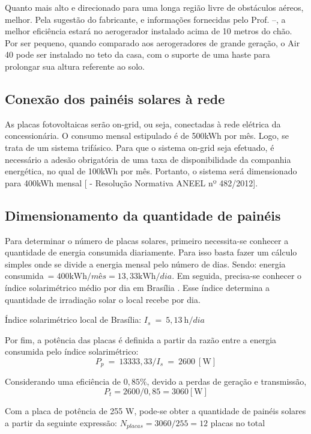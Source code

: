 	Quanto mais alto e direcionado para uma longa região livre de obstáculos aéreos, melhor. Pela sugestão do fabricante, e informações fornecidas pelo Prof. \cite{CORMANE} --, a melhor eficiência estará no aerogerador instalado acima de 10 metros do chão. Por ser pequeno, quando comparado aos aerogeradores de grande geração, o Air 40 pode ser instalado no teto da casa, com o suporte de uma haste para prolongar sua altura referente ao solo.

\subsection{Conexão dos painéis solares à rede}

	As placas fotovoltaicas serão on-grid, ou seja, conectadas à rede elétrica da concessionária. O consumo mensal estipulado é de 500kWh por mês. Logo, se trata de um sistema trifásico. Para que o sistema on-grid seja efetuado, é necessário a adesão obrigatória de uma taxa de disponibilidade da companhia energética, no qual de 100kWh por mês. Portanto, o sistema será dimensionado para 400kWh mensal [\cite{2013Aneel} -  Resolução Normativa ANEEL nº 482/2012].

\subsection{Dimensionamento da quantidade de painéis}

	Para determinar o número de placas solares, primeiro necessita-se conhecer a quantidade de energia consumida diariamente. Para isso basta fazer um cálculo simples onde se divide a energia mensal pelo número de dias. Sendo: energia consumida$\ = 400 \si{\kilo\watt\hour}/mês = 13,33 \si{\kilo\watt\hour}/dia$. Em seguida, precisa-se conhecer o índice solarimétrico médio por dia em Brasília \cite{2000UFPE}. Esse índice determina a quantidade de irradiação solar o local recebe por dia.

	Índice solarimétrico local de Brasília: $I_s\ =\ 5,13\ \si{\hour}/dia$

	Por fim, a potência das placas é definida a partir da razão entre a energia consumida pelo índice solarimétrico:$$P_p\ =\ 13333,33/I_s\ =\ 2600\ [\si{\watt}]$$

	Considerando uma eficiência de $0,85\%$, devido a perdas de geração e transmissão, $$P_t = 2600/0,85 = 3060 [\si{\watt}]$$

	Com a placa de potência de 255 W, pode-se obter a quantidade de painéis solares a partir da seguinte expressão: $N_{placas} = 3060/255 = 12$ placas no total

